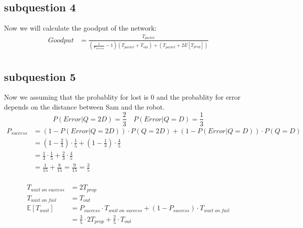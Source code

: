 \documentclass{article}
\begin{document}
    \subsection{subquestion 4}
    Now we will calculate the goodput of the network:
    \begin{equation}
        \begin{split}
            Goodput &= \frac{T_{packet}}{(\frac{1}{P_{success}}-1)(T_{packet} + T_{out}) + (T_{packet} + 2E[T_{prop}])} \\
        \end{split}
    \end{equation} 

    \subsection{subquestion 5}
    Now we assuming that the probablity for lost is 0 and the probablity for error depends on the distance between Sam and the robot.
    \begin{equation}
        P(Error | Q=2D) = \frac23 \quad P(Error | Q=D) = \frac13
    \end{equation}
    \begin{equation}
        \begin{split}
            P_{success}  &=  (1-P(Error | Q=2D))  \cdot P(Q=2D) + (1-P(Error | Q=D)) \cdot P(Q=D) \\
             &= (1-\frac23)\cdot \frac{1}{5} + (1-\frac13) \cdot \frac{4}{5}\\
             &= \frac{1}{3} \cdot \frac15 + \frac23 \cdot \frac45 \\
             &= \frac{1}{15} + \frac{8}{15}  = \frac9{15} = \frac{3}{5}\\
        \end{split}
    \end{equation}
    
    \begin{equation}
        \begin{split}
            T_{wait \;on\; success} &=  2T_{prop} \\
            T_{wait \;on\; fail} &=  T_{out} \\
            \mathbb{E}[T_{wait}] &= P_{success} \cdot T_{wait \;on\; success} + (1-P_{success}) \cdot T_{wait \;on\; fail} \\
             &= \frac{3}{5} \cdot  2T_{prop} + \frac{2}{5} \cdot T _{out} \\ 
        \end{split}
    \end{equation}
\end{document}
